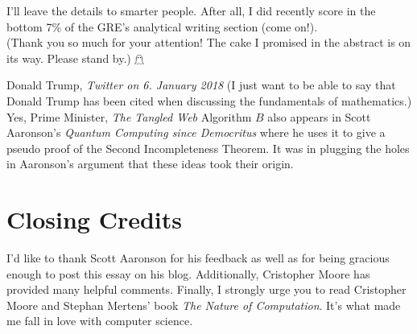 \documentclass{article}
\theoremstyle{theorem}
\begin{document}
I'll leave the details to smarter people. After all, I did recently score in the bottom 7\% of the GRE's analytical writing section (come on!).\\[2em]
\footnotesize{(Thank you so much for your attention! The cake I promised in the abstract is on its way. Please stand by.) $\mathghost$}

\begin{thebibliography}{1}
Donald Trump, \textit{Twitter on 6. January 2018} (I just want to be able to say that Donald Trump has been cited when discussing the fundamentals of mathematics.)
Yes, Prime Minister, \textit{The Tangled Web}
 Algorithm $B$ also appears in Scott Aaronson's \textit{Quantum Computing since Democritus} where he uses it to give a pseudo proof of the Second Incompleteness Theorem. It was in plugging the holes in Aaronson's argument that these ideas took their origin.
\end{thebibliography}

\section*{Closing Credits}

I'd like to thank Scott Aaronson for his feedback as well as for being gracious enough to post this essay on his blog. Additionally, Cristopher Moore has provided many helpful comments. Finally, I strongly urge you to read Cristopher Moore and Stephan Mertens' book \textit{The Nature of Computation}. It's what made me fall in love with computer science.


\vfill\eject
\end{document}
